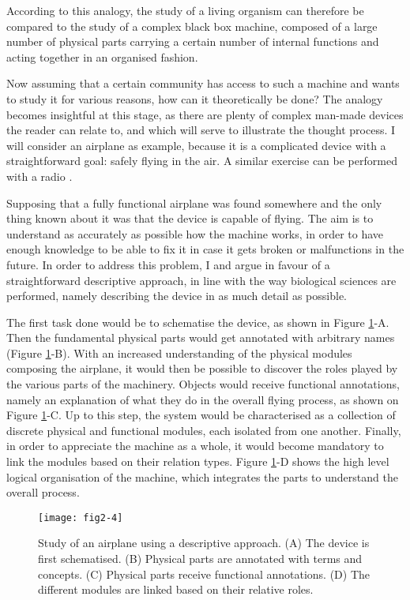 According to this analogy, the study of a living organism can therefore be compared to the study of a complex black box machine, composed of a large number of physical parts carrying a certain number of internal functions and acting together in an organised fashion.

Now assuming that a certain community has access to such a machine and wants to study it for various reasons, how can it theoretically be done? The analogy becomes insightful at this stage, as there are plenty of complex man-made devices the reader can relate to, and which will serve to illustrate the thought process. I will consider an airplane as example, because it is a complicated device with a straightforward goal: safely flying in the air. A similar exercise can be performed with a radio \citep{lazebnik2002can}.

Supposing that a fully functional airplane was found somewhere and the only thing known about it was that the device is capable of flying. The aim is to understand as accurately as possible how the machine works, in order to have enough knowledge to be able to fix it in case it gets broken or malfunctions in the future. In order to address this problem, I and \cite{lazebnik2002can} argue in favour of a straightforward descriptive approach, in line with the way biological sciences are performed, namely describing the device in as much detail as possible.

The first task done would be to schematise the device, as shown in Figure \ref{fig2-4}-A. Then the fundamental physical parts would get annotated with arbitrary names (Figure \ref{fig2-4}-B). With an increased understanding of the physical modules composing the airplane, it would then be possible to discover the roles played by the various parts of the machinery. Objects would receive functional annotations, namely an explanation of what they do in the overall flying process, as shown on Figure \ref{fig2-4}-C. Up to this step, the system would be characterised as a collection of discrete physical and functional modules, each isolated from one another. Finally, in order to appreciate the machine as a whole, it would become mandatory to link the modules based on their relation types. Figure \ref{fig2-4}-D shows the high level logical organisation of the machine, which integrates the parts to understand the overall process.

\begin{figure}[H]
    \centering
    \texttt{[image: fig2-4]}
    \caption{Study of an airplane using a descriptive approach. (A) The device is first schematised. (B) Physical parts are annotated with terms and concepts. (C) Physical parts receive functional annotations. (D) The different modules are linked based on their relative roles.}
    \label{fig2-4}
\end{figure}


